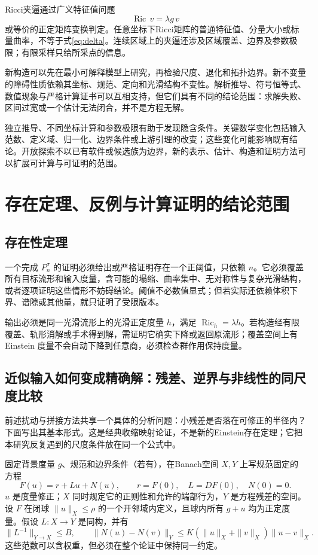 \documentclass[11pt,a4paper]{article}
\theoremstyle{definition}
\newcommand{\Ric}{\operatorname{Ric}}
\begin{document}
Ricci夹逼通过广义特征值问题
\[
\Ric\,v=\lambda g\,v
\]
或等价的正定矩阵变换判定。任意坐标下Ricci矩阵的普通特征值、分量大小或标量曲率，不等于式\eqref{eq:delta}。连续区域上的夹逼还涉及区域覆盖、边界及参数极限；有限采样只给所采点的信息。

新构造可以先在最小可解释模型上研究，再检验尺度、退化和拓扑边界。新不变量的障碍性质依赖其坐标、规范、定向和光滑结构不变性。解析推导、符号恒等式、数值现象与严格计算证书可以互相支持，但它们具有不同的结论范围：求解失败、区间过宽或一个估计无法闭合，并不是方程无解。

独立推导、不同坐标计算和参数极限有助于发现隐含条件。关键数学变化包括输入范数、定义域、归一化、边界条件或上游引理的改变；这些变化可能影响既有结论。开放探索不以已有软件或候选族为边界，新的表示、估计、构造和证明方法可以扩展可计算与可证明的范围。

\section{存在定理、反例与计算证明的结论范围}\label{sec:acceptance}

\subsection{存在性定理}

一个完成 $P_n^\sigma$ 的证明必须给出或严格证明存在一个正阈值，只依赖 $n$。它必须覆盖所有目标流形和输入度量，含可能的塌缩、曲率集中、无对称性与复杂光滑结构，或者逐项证明这些情形不妨碍结论。阈值不必数值显式；但若实际还依赖体积下界、谱隙或其他量，就只证明了受限版本。

输出必须是同一光滑流形上的光滑正定度量 $h$，满足 $\Ric_h=\lambda h$。若构造经有限覆盖、轨形消解或手术得到解，需证明它确实下降或返回原流形；覆盖空间上有 Einstein 度量不会自动下降到任意商，必须检查群作用保持度量。

\subsection{近似输入如何变成精确解：残差、逆界与非线性的同尺度比较}\label{sec:perturbation-bridge}

前述扰动与拼接方法共享一个具体的分析问题：小残差是否落在可修正的半径内？下面写出其基本形式。这是经典收缩映射论证，不是新的Einstein存在定理；它把本研究反复遇到的尺度条件放在同一个公式中。

固定背景度量 $g$、规范和边界条件（若有），在Banach空间 $X,Y$ 上写规范固定的方程
\[
 F(u)=r+Lu+N(u),\qquad r=F(0),\quad L=DF(0),\quad N(0)=0.
\]
$u$ 是度量修正；$X$ 同时规定它的正则性和允许的端部行为，$Y$ 是方程残差的空间。设 $F$ 在闭球 $\|u\|_X\le\rho$ 的一个开邻域内定义，且球内所有 $g+u$ 均为正定度量。假设 $L:X\to Y$ 是同构，并有
\begin{equation}\label{eq:nonlinear-inputs}
 \|L^{-1}\|_{Y\to X}\le B,\qquad
 \|N(u)-N(v)\|_Y
 \le K(\|u\|_X+\|v\|_X)\|u-v\|_X.
\end{equation}
这些范数可以含权重，但必须在整个论证中保持同一约定。
\end{document}
